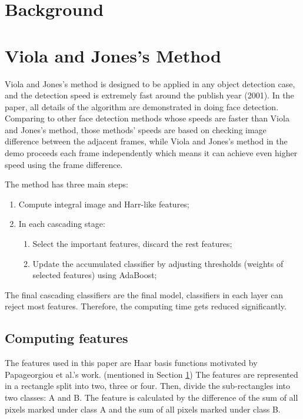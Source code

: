 \documentclass[10pt,twocolumn,letterpaper]{article}
\begin{document}
\section{Background} \label{sec:bg}


\section{Viola and Jones's Method}
Viola and Jones's method is designed to be applied in any object detection case, and the detection speed is extremely fast around the publish year (2001).
In the paper, all details of the algorithm are demonstrated in doing face detection.
Comparing to other face detection methods whose speeds are faster than Viola and Jones's method,
those methods' speeds are based on checking image difference between the adjacent frames,
while Viola and Jones's method in the demo proceeds each frame independently which means it can achieve even higher speed using the frame difference.

The method has three main steps:
\begin{enumerate}
    \item Compute integral image and Harr-like features;
    \item In each cascading stage:
          \begin{enumerate}
              \item Select the important features, discard the rest features;
              \item Update the accumulated classifier by adjusting thresholds (weights of selected features) using AdaBoost;
          \end{enumerate}
\end{enumerate}

The final cascading classifiers are the final model, classifiers in each layer can reject most features.
Therefore, the computing time gets reduced significantly.

\subsection{Computing features} \label{sec:cf}
The features used in this paper are Haar basis functions motivated by Papageorgiou et al.'s work. (mentioned in Section \ref{sec:bg})
The features are represented in a rectangle split into two, three or four. Then, divide the sub-rectangles into two classes: A and B.
The feature is calculated by the difference of the sum of all pixels marked under class A and the sum of all pixels marked under class B.
\end{document}
